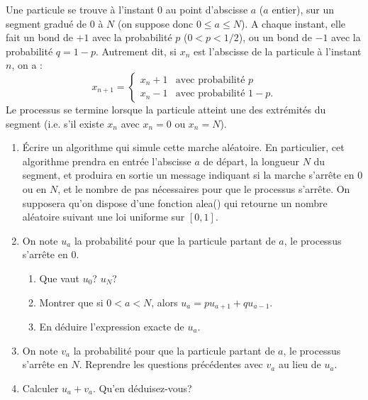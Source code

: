 \documentclass{book}
\begin{document}
\begin{Exercice}
Une particule se trouve à l'instant 0 au point d'abscisse $a$ ($a$ entier), sur un segment gradué de $0$ à $N$ (on suppose donc $0\leq a\leq N$).
A chaque instant, elle fait un bond de $+1$ avec la probabilité $p$ ($0<p<1/2$), ou un bond de $-1$ avec la probabilité $q=1-p$.
Autrement dit, si $x_n$ est l'abscisse de la particule à l'instant $n$, on a :
$$x_{n+1}=\left\{\begin{array}{ll}
x_n+1&\textrm{avec probabilité $p$}\\
x_n-1&\textrm{avec probabilité $1-p$.}
\end{array}\right.$$
Le processus se termine lorsque la particule atteint une des extrémités du segment (i.e. s'il existe $x_n$ avec $x_n=0$ ou $x_n=N$).
\begin{enumerate}
\item \'Ecrire un algorithme qui simule cette marche aléatoire. En particulier, cet algorithme prendra en entrée l'abscisse $a$ de départ,
la longueur $N$ du segment,
et produira en sortie un message indiquant si la marche s'arrête en 0 ou en $N$, et le nombre de pas nécessaires pour que le processus s'arrête.
On supposera qu'on dispose d'une fonction alea() qui retourne un nombre aléatoire suivant une loi uniforme sur $[0,1]$.
\item On note $u_a$ la probabilité pour que la particule partant de $a$, le processus s'arrête en $0$. 
\begin{enumerate}
\item Que vaut $u_0$? $u_N$?
\item Montrer que si $0<a<N$, alors $u_a={pu_{a+1}}+qu_{a-1}$.
\item En déduire l'expression exacte de $u_a$.
\end{enumerate}
\item On note $v_a$ la probabilité pour que la particule partant de $a$, le processus s'arrête en $N$. Reprendre les questions précédentes avec $v_a$ au lieu de $u_a$.
\item Calculer $u_a+v_a$. Qu'en déduisez-vous?
\end{enumerate}

\end{Exercice}
\end{document}
